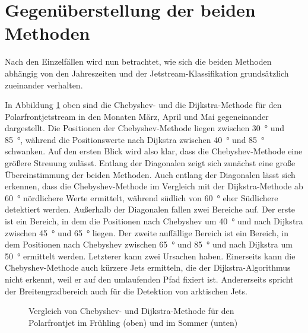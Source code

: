 \section{Gegenüberstellung der beiden Methoden}

Nach den Einzelfällen wird nun betrachtet, wie sich die beiden Methoden abhängig von den Jahreszeiten und der Jetstream-Klassifikation grundsätzlich zueinander verhalten.

In Abbildung \ref{fig:comp-pfj-warm} oben sind die Chebyshev- und die Dijkstra-Methode für den Polarfrontjetstream in den Monaten März, April und Mai gegeneinander dargestellt. Die Positionen der Chebyshev-Methode liegen zwischen \SI{30}{\degree} und \SI{85}{\degree}, während die Positionswerte nach Dijkstra zwischen \SI{40}{\degree} und \SI{85}{\degree} schwanken. Auf den ersten Blick wird also klar, dass die Chebyshev-Methode eine größere Streuung zulässt. Entlang der Diagonalen zeigt sich zunächst eine große Übereinstimmung der beiden Methoden. Auch entlang der Diagonalen lässt sich erkennen, dass die Chebyshev-Methode im Vergleich mit der Dijkstra-Methode ab \SI{60}{\degree} nördlichere Werte ermittelt, während südlich von \SI{60}{\degree} eher Südlichere detektiert werden. Außerhalb der Diagonalen fallen zwei Bereiche auf. Der erste ist ein Bereich, in dem die Positionen nach Chebyshev um \SI{40}{\degree} und nach Dijkstra zwischen \SI{45}{\degree} und \SI{65}{\degree} liegen. Der zweite auffällige Bereich ist ein Bereich, in dem Positionen nach Chebyshev zwischen \SI{65}{\degree} und \SI{85}{\degree} und nach Dijkstra um \SI{50}{\degree} ermittelt werden. Letzterer kann zwei Ursachen haben. Einerseits kann die Chebyshev-Methode auch kürzere Jets ermitteln, die der Dijkstra-Algorithmus nicht erkennt, weil er auf den umlaufenden Pfad fixiert ist. Andererseits spricht der Breitengradbereich auch für die Detektion von arktischen Jets.

\begin{figure}[hbt] 
  \centering
  \begin{minipage}{\textwidth}
  \centering
  \end{minipage}
  \begin{minipage}{\textwidth}
  \centering
  \end{minipage}
  \caption[Vergleich des Polarfrontjets nach beiden Methoden für Frühling und Sommer]{Vergleich von Chebyshev- und Dijkstra-Methode für den Polarfrontjet im Frühling (oben) und im Sommer (unten)} \label{fig:comp-pfj-warm}
\end{figure}

